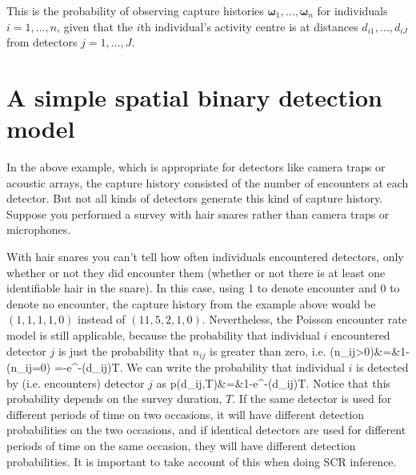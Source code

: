 This is the probability of observing capture histories $\bm{\omega}_1,\ldots,\bm{\omega}_n$ for individuals $i=1,\ldots,n$, given that the $i$th individual's activity centre is at distances $d_{i1},\ldots,d_{iJ}$ from detectors $j=1,\ldots,J$. 

\section{A simple spatial binary detection model}
\label{sec:ER+detfun.simple.det.model}

In the above example, which is appropriate for detectors like camera traps or acoustic arrays, the capture history consisted of the number of encounters at each detector. But not all kinds of detectors generate this kind of capture history. Suppose  you performed a survey with hair snares rather than camera traps or microphones.

With hair snares you can't tell how often individuals encountered detectors, only whether or not they did encounter them (whether or not there is at least one identifiable hair in the snare). In this case, using 1 to denote encounter and 0 to denote no encounter, the capture history from the example above would be $(1,1,1,1,0)$ instead of $(11,5,2,1,0)$. Nevertheless, the Poisson encounter rate model is still applicable, because the probability that individual $i$ encountered detector $j$ is just the probability that $n_{ij}$ is greater than zero, i.e.
\be
{}(n_{ij}>0)&=&1-(n_{ij}=0)
\;=-e^{-\lambda(d_{ij})T}. 
\ee
We can write the probability that individual $i$ is detected by (i.e. encounters) detector $j$ as 
\be
p(d_{ij},T)&=&1-e^{-\lambda(d_{ij})T}. 
\label{eq:ER+detfun.binaryp}
\ee
Notice that this probability depends on the survey duration, $T$. If the same detector is used for different periods of time on two occasions, it will have different detection probabilities on the two occasions, and if identical detectors are used for different periods of time on the same occasion, they will have different detection probabilities. It is important to take account of this when doing SCR inference.


